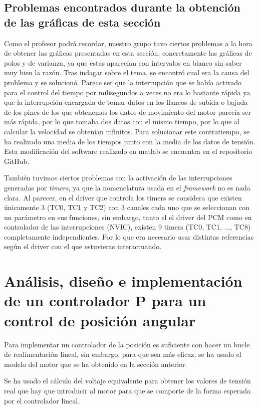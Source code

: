 \documentclass[a4paper]{article}
\begin{document}
\subsection{Problemas encontrados durante la obtención de las gráficas de esta sección}
Como el profesor podrá recordar, nuestro grupo tuvo ciertos problemas a la hora de obtener las gráficas presentadas en esta sección, concretamente las gráficas de polos y de varianza,
ya que estas aparecían con intervalos en blanco sin saber muy bien la razón. Tras indagar sobre el tema, se encontró cual era la causa
del problema y se solucionó. Parece ser que la interrupción que se había activado para el control del tiempo por milisegundos a veces
no era lo bastante rápida ya que la interrupción encargada de tomar datos en los flancos de subida o bajada de los pines de los que obtenemos
los datos de movimiento del motor parecía ser más rápida, por lo que tomaba dos datos con el mismo tiempo, por lo que al calcular la velocidad se obtenían infinitos.
Para solucionar este contratiempo, se ha realizado una media de los tiempos junto con la media de los datos de tensión.
Esta modificación del software realizado en matlab se encuentra en el repositorio GitHub.

También tuvimos ciertos problemas con la activación de las interrupciones generadas por \emph{timers}, ya que la nomenclatura usada en el \emph{framework} no es nada clara.
Al parecer, en el driver que controla los timers se considera que existen únicamente 3 (TC0, TC1 y TC2) con 3 canales cada uno que se seleccionan con un parámetro en sus funciones,
sin embargo, tanto el el driver del PCM como en controlador de las interrupciones (NVIC), existen 9 timers (TC0, TC1, ..., TC8) completamente independientes. Por lo que era necesario
usar distintas referencias según el driver con el que estuvieras interactuando.

\section{Análisis, diseño e implementación de un controlador P para un control de posición angular}

Para implementar un controlador de la posición es suficiente con hacer un bucle de realimentación lineal,
sin embargo, para que sea más eficaz, se ha usado el modelo del motor que se ha obtenido en la sección anterior.

Se ha usado el cálculo del voltaje equivalente para obtener los valores de tensión real que hay que introducir al motor para que se comporte de la forma esperada por el
controlador lineal.
\end{document}
